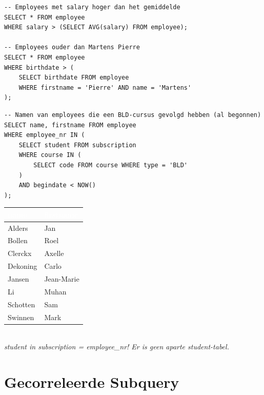 \documentclass[10pt,a4paper]{article}
\newcommand{\TBLH}[1]{\textbf{\textcolor{white}{#1}}}
\begin{document}
\begin{tcolorbox}[sqlbox,title=Subquery met 1 resultaat: gebruik =]
\begin{lstlisting}
-- Employees met salary hoger dan het gemiddelde
SELECT * FROM employee
WHERE salary > (SELECT AVG(salary) FROM employee);

-- Employees ouder dan Martens Pierre
SELECT * FROM employee
WHERE birthdate > (
    SELECT birthdate FROM employee
    WHERE firstname = 'Pierre' AND name = 'Martens'
);
\end{lstlisting}
\end{tcolorbox}

\begin{tcolorbox}[sqlbox,title=Subquery met meerdere resultaten: gebruik IN]
\begin{lstlisting}
-- Namen van employees die een BLD-cursus gevolgd hebben (al begonnen)
SELECT name, firstname FROM employee
WHERE employee_nr IN (
    SELECT student FROM subscription
    WHERE course IN (
        SELECT code FROM course WHERE type = 'BLD'
    )
    AND begindate < NOW()
);
\end{lstlisting}
\end{tcolorbox}

\begin{tcolorbox}[resbox,title=Resultaat]
{\scriptsize\begin{tabular}{|l|l|}
\hline
\rowcolor{tblhead}\TBLH{name} & \TBLH{firstname} \\ \hline
Alders   & Jan        \\ \hline
\rowcolor{rowalt}
Bollen   & Roel       \\ \hline
Clerckx  & Axelle     \\ \hline
\rowcolor{rowalt}
Dekoning & Carlo      \\ \hline
Jansen   & Jean-Marie \\ \hline
\rowcolor{rowalt}
Li       & Muhan      \\ \hline
Schotten & Sam        \\ \hline
\rowcolor{rowalt}
Swinnen  & Mark       \\ \hline
\end{tabular}}\\[2pt]
\textit{student in subscription = employee\_nr! Er is geen aparte student-tabel.}
\end{tcolorbox}

\section{Gecorreleerde Subquery}
\end{document}

